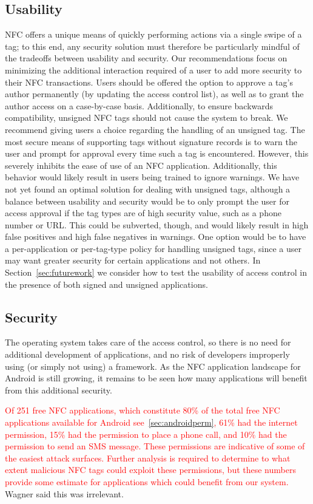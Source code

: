 \documentclass[12pt]{article}
\newcommand\TODO[1]{\textcolor{red}{#1}}
\begin{document}
\subsection{Usability}
NFC offers a unique means of quickly performing actions via a single swipe of a tag; to this end, any security solution must therefore be particularly mindful of the tradeoffs between usability and security.
Our recommendations focus on minimizing the additional interaction required of a user to add more security to their NFC transactions.
Users should be offered the option to approve a tag's author permanently (by updating the access control list), as well as to grant the author access on a case-by-case basis.
Additionally, to ensure backwards compatibility, unsigned NFC tags should not cause the system to break.
We recommend giving users a choice regarding the handling of an unsigned tag.
The most secure means of supporting tags without signature records is to warn the user and prompt for approval every time such a tag is encountered.
However, this severely inhibits the ease of use of an NFC application.
Additionally, this behavior would likely result in users being trained to ignore warnings.
We have not yet found an optimal solution for dealing with unsigned tags, although a balance between usability and security would be to only prompt the user for access approval if the tag types are of high security value, such as a phone number or URL.
This could be subverted, though, and would likely result in high false positives and high false negatives in warnings.
One option would be to have a per-application or per-tag-type policy for handling unsigned tags, since a user may want greater security for certain applications and not others.
In Section~\ref{sec:futurework} we consider how to test the usability of access control in the presence of both signed and unsigned applications.

\subsection{Security}
The operating system takes care of the access control, so there is no need for additional development of applications, and no risk of developers improperly using (or simply not using) a framework.
As the NFC application landscape for Android is still growing, it remains to be seen how many applications will benefit from this additional security.

\TODO{Of 251 free NFC applications, which constitute 80\% of the total free NFC applications available for Android see~\ref{sec:androidperm}, 61\% had the internet permission, 15\% had the permission to place a phone call, and 10\% had the permission to send an SMS message. These permissions are indicative of some of the easiest attack surfaces. Further analysis is required to determine to what extent malicious NFC tags could exploit these permissions, but these numbers provide some estimate for applications which could benefit from our system.} Wagner said this was irrelevant. 
\end{document}
